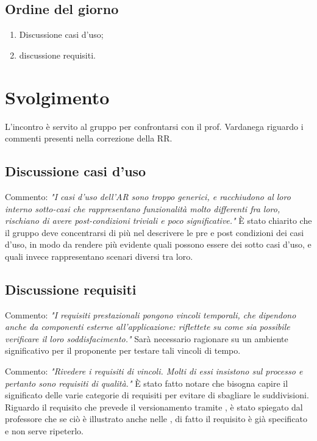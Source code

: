 \documentclass[]{article}
\begin{document}
		\subsection{Ordine del giorno}
		\begin{enumerate}
			\item Discussione casi d'uso;
			\item discussione requisiti.
		\end{enumerate}
\newpage
	\section{Svolgimento}
	L'incontro è servito al gruppo per confrontarsi con il prof. Vardanega riguardo i commenti presenti nella correzione della RR.

		\subsection{Discussione casi d'uso}
		Commento: \textit{"I casi d’uso dell’AR sono troppo generici, e racchiudono al loro interno sotto-casi che rappresentano funzionalità molto differenti fra loro, rischiano di avere post-condizioni triviali e poco significative."}
		\newline
		È stato chiarito che il gruppo deve concentrarsi di più nel descrivere le pre e post condizioni dei casi d'uso, in modo da rendere più evidente quali possono essere dei sotto casi d'uso, e quali invece rappresentano scenari diversi tra loro.


		\subsection{Discussione requisiti}
		Commento: \textit{"I requisiti prestazionali pongono vincoli temporali, che dipendono anche da componenti esterne all’applicazione: riflettete su come sia possibile verificare il loro soddisfacimento."}
		\newline
		Sarà necessario ragionare su un ambiente significativo per il proponente per testare tali vincoli di tempo. \vspace{0.3cm}

		\noindent Commento: \textit{"Rivedere i requisiti di vincoli. Molti di essi insistono sul processo e pertanto sono requisiti di qualità."}
		\newline
		È stato fatto notare che bisogna capire il significato delle varie categorie di requisiti per evitare di sbagliare le suddivisioni. Riguardo il requisito che prevede il versionamento tramite , è stato spiegato dal professore che se ciò è illustrato anche nelle , di fatto il requisito è già specificato e non serve ripeterlo.\vspace{0.3cm}
\end{document}
